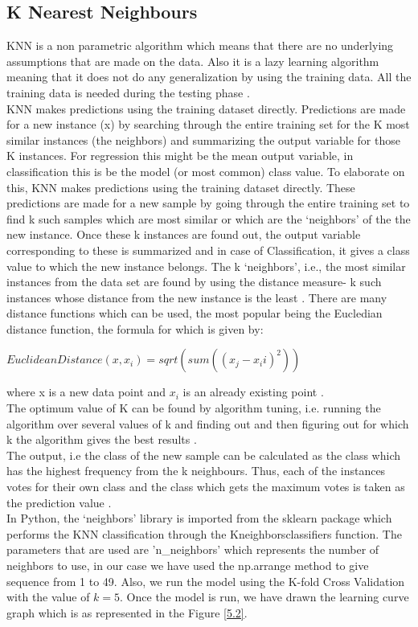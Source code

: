 \subsection{K Nearest Neighbours}
KNN is a non parametric algorithm which means that there are no underlying assumptions that are made on the data. Also it is a lazy learning algorithm meaning that it does not do any generalization by using the training data. All the training data is needed during the testing phase \cite{link11}.\\
KNN makes predictions using the training dataset directly. Predictions are made for a new instance (x) by searching through the entire training set for the K most similar instances (the neighbors) and summarizing the output variable for those K instances. For regression this might be the mean output variable, in classification this is be the model (or most common) class value. To elaborate on this, KNN makes predictions using the training dataset directly. These predictions are made for a new sample by going through the entire training set to find k such samples which are most similar or which are the `neighbors' of the the new instance. Once these k instances are found out, the output variable corresponding to these is summarized and in case of Classification, it gives a class value to which the new instance belongs. The k `neighbors', i.e., the most similar instances from the data set are found by using the distance measure- k such instances whose distance from the new instance is the least \cite{link11}. There are many distance functions which can be used, the most popular being the Eucledian distance function, the formula for which is given by:

$EuclideanDistance(x, x_i) = sqrt( sum( (x_j-x_ii)^2 ) )$

where x is a new data point and $x_i$ is an already existing point \cite{link11}.\\
The optimum value of K can be found by algorithm tuning, i.e. running the algorithm over several values of k and finding out and then figuring out for which k the algorithm gives the best results \cite{link12}.\\
The output, i.e the class of the new sample can be calculated as the class which has the highest frequency from the k neighbours. Thus, each of the instances votes for their own class and the class which gets the maximum votes is taken as the prediction value \cite{link12}. \\
In Python, the `neighbors' library is imported from the sklearn package which performs the KNN classification through the Kneighborsclassifiers function. The parameters that are used are 'n\_neighbors' which represents the number of neighbors to use, in our case we have used the np.arrange method to give  sequence from 1 to 49. Also, we run the model using the K-fold Cross Validation with the value of $k=5$. Once the model is run, we have drawn the learning curve graph which is as represented in the Figure \ref{5.2}. 

